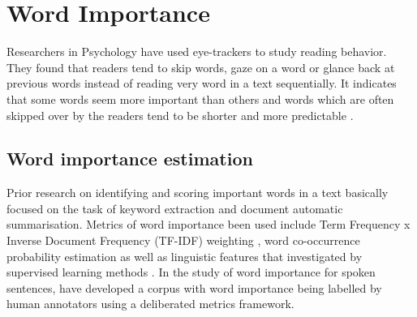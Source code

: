 %
%

\section{Word Importance}
Researchers in Psychology have used eye-trackers to study reading behavior. They found that readers tend to skip words, gaze on a word or glance back at previous words instead of reading very word in a text sequentially. It indicates that some words seem more important than others and words which are often skipped over by the readers tend to be shorter and more predictable \citep{Rayner2011}. 

\subsection{Word importance estimation}

Prior research on identifying and scoring important words in a text basically focused on the task of keyword extraction and document automatic summarisation. Metrics of word importance been used include Term Frequency x Inverse Document Frequency (TF-IDF) weighting \citep{HaCohen-Kerner2010}, word co-occurrence probability estimation \citep{Y.MATSUO2004} as well as linguistic features that investigated by supervised learning methods \citep{Liu2011, I.Sheeba2012}. In the study of word importance for spoken sentences, \citet{Kafle2018} have developed a corpus with word importance being labelled by human annotators using a deliberated metrics framework.

